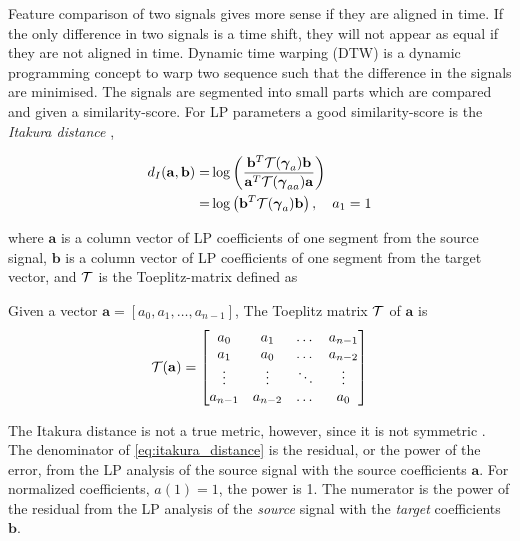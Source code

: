 Feature comparison of two signals gives more sense if they are aligned in time. If the only difference in two signals is a time shift, they will not appear as equal if they are not aligned in time. Dynamic time warping (DTW) is a dynamic programming concept to warp two sequence such that the difference in the signals are minimised. The signals are segmented into small parts which are compared and given a similarity-score. For LP parameters a good similarity-score is the \emph{Itakura distance} \cite{itakura90},
\newcommand{\ita}{d_{I}}
\begin{definition}
	\begin{equation}
		\label{eq:itakura_distance}
		\begin{split}
			\ita(\mathbf{a},\mathbf{b}) = & \log\pbrackets{\frac{\mathbf{b}^T \ttt(\auto_{a}) \mathbf{b}}{\mathbf{a}^T \ttt(\auto_{aa}) \mathbf{a}}} \\
			 = & \log\pbrackets{\mathbf{b}^T \ttt(\auto_{a}) \mathbf{b}}, \quad a_1 = 1
		\end{split}
	\end{equation}
\end{definition}
where $\mathbf{a}$ is a column vector of LP coefficients of one segment from the source signal, $\mathbf{b}$ is a column vector of LP coefficients of one segment from the target vector, and $\mathcal T$ is the Toeplitz-matrix defined as
\begin{definition}
	Given a vector $\mathbf{a} = [a_0, a_1,\dotsc, a_{n-1}]$, The Toeplitz matrix $\mathcal T$ of $\mathbf{a}$ is 
	\begin{equation}
		\label{eq:toeplitz}
		\mathcal T(\mathbf{a}) = 
		\begin{bmatrix}
		a_0 & a_1 & \dots & a_{n-1} 	\\
		a_1 & a_0 & \dots & a_{n-2} \\
		\vdots & \vdots & \ddots & \vdots \\
		a_{n-1} & a_{n-2} & \dots & a_{0}
		\end{bmatrix}
	\end{equation}	
\end{definition}

The Itakura distance is not a true metric, however, since it is not symmetric \cite{kreyszig78}. The denominator of \eqref{eq:itakura_distance} is the residual, or the power of the error, from the LP analysis of the source signal with the source coefficients $\mathbf{a}$. For normalized coefficients, $a(1) = 1$, the power is 1. The numerator is the power of the residual from the LP analysis of the \emph{source} signal with the \emph{target} coefficients $\mathbf{b}$. 

